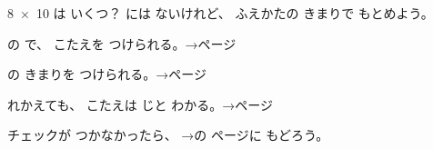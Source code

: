 \bkproblem \mbox{8 × 10} は いくつ？ には ないけれど、 ふえかたの きまりで もとめよう。
\bkshikiran[3\zw]

\begin{furikaeri}\bkqlrag
\begin{checklist}
\item {}の で、 こたえを つけられる。\hfill{\footnotesize\sffamily\color{bkTheme}→\pageref{bk:1-13:yomikata}ページ}
\item {}の きまりを つけられる。\hfill{\footnotesize\sffamily\color{bkTheme}→\pageref{bk:1-13:fuekata}ページ}
\item {}れかえても、 こたえは じと わかる。\hfill{\footnotesize\sffamily\color{bkTheme}→\pageref{bk:1-13:irekae}ページ}
\end{checklist}
チェックが つかなかったら、 →の ページに もどろう。
\end{furikaeri}

\clearpage
